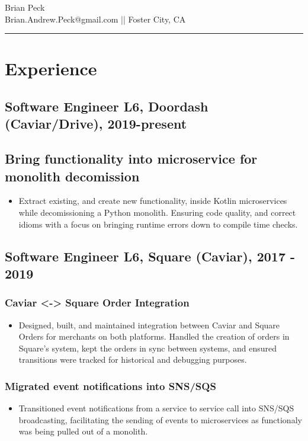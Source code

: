 \documentclass[11pt]{article}
\title{}
\date{}
\begin{document}
\begin{center}
{\huge Brian Peck} \\
Brian.Andrew.Peck@gmail.com || Foster City, CA
\hrule
\end{center}

\section*{Experience}
\label{sec-1}


\subsection*{Software Engineer L6, Doordash (Caviar/Drive), 2019-present }
\label{sec 1-1}
\label{sec-1-1-1}
\subsection*{Bring functionality into microservice for monolith decomission}
\begin{itemize}
\item Extract existing, and create new functionality, inside Kotlin microservices while decomissioning a Python monolith. Ensuring code quality, and correct idioms with a focus on bringing runtime errors down to compile time checks.
\end{itemize}

\subsection*{Software Engineer L6, Square (Caviar), 2017 - 2019}
\label{sec-1-2}
\subsubsection*{Caviar <-> Square Order Integration}
\label{sec-1-2-1}

\begin{itemize}
\item Designed, built, and maintained integration between Caviar and Square Orders for merchants on both platforms. Handled the creation of orders in Square's system, kept the orders in sync between systems, and ensured transitions were tracked for historical and debugging purposes.
\end{itemize}

\subsubsection*{Migrated event notifications into SNS/SQS}
\label{sec-1-2-1}
\begin{itemize}
\item Transitioned event notifications from a service to service call into SNS/SQS broadcasting, facilitating the sending of events to microservices as functionaly was being pulled out of a monolith.
\end{itemize}
\end{document}
